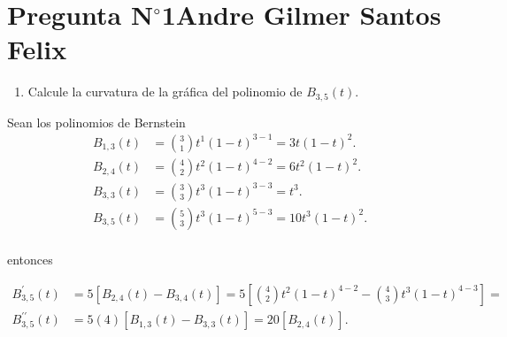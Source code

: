 \section{Pregunta N$^{\circ}$1\qquad Andre Gilmer Santos Felix}



\begin{frame}
    \begin{enumerate}\setcounter{enumi}{0}
        \item

              Calcule la curvatura de la gráfica del polinomio de
              $B_{3,5}\left(t\right)$.
    \end{enumerate}

    \begin{solution}
        Sean los polinomios de Bernstein
        \begin{align*}
            B_{1,3}\left(t\right) & =
            \binom{3}{1}
            t^{1}
            \left(1-t\right)^{3-1}=
            3t{\left(1-t\right)}^{2}.      \\
            B_{2,4}\left(t\right) & =
            \binom{4}{2}
            t^{2}
            \left(1-t\right)^{4-2}=
            6t^{2}{\left(1-t\right)}^{2}.  \\
            B_{3,3}\left(t\right) & =
            \binom{3}{3}
            t^{3}
            \left(1-t\right)^{3-3}=
            t^{3}.                         \\
            B_{3,5}\left(t\right) & =
            \binom{5}{3}
            t^{3}
            \left(1-t\right)^{5-3}=
            10t^{3}{\left(1-t\right)}^{2}. \\
        \end{align*}

        entonces

        \begin{align*}
            B^{\prime}_{3,5}\left(t\right)       & =
            5
            \left[
                B_{2,4}\left(t\right)-
                B_{3,4}\left(t\right)
                \right]=
            5
            \left[
            \binom{4}{2}t^{2}\left(1-t\right)^{4-2}-
            \binom{4}{3}t^{3}\left(1-t\right)^{4-3}
            \right]=                                 \\
            B^{\prime\prime}_{3,5}\left(t\right) & =
            5\left(4\right)
            \left[
                B_{1,3}\left(t\right)-
                B_{3,3}\left(t\right)
                \right]=
            20
            \left[
                B_{2,4}\left(t\right)
                \right].
        \end{align*}


\end{solution}
\end{frame}
